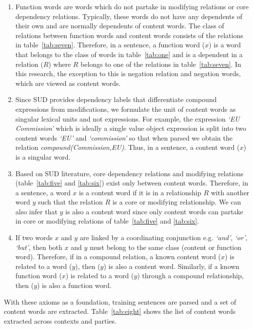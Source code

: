\begin{enumerate}
\item
Function words are words which do not partake in modifying relations or core dependency relations. Typically, these words do not have any dependents of their own and are normally dependents of content words. The class of relations between function words and content words consists of the relations in table~\ref{tab:seven}. Therefore, in a sentence, a function word ($x$) is a word that belongs to the class of words in table~\ref{tab:one} and is a dependent in a relation ($R$) where $R$ belongs to one of the relations in table~\ref{tab:seven}. In this research, the exception to this is negation relation and negation words, which are viewed as content words.
\item
Since SUD provides dependency labels that differentiate compound expressions from modifications, we formulate the unit of content words as singular lexical units and not expressions. For example, the expression \textit{`EU Commission'} which is ideally a single value object expression is split into two content words \textit{`EU'} and \textit{`commission'} so that when parsed we obtain the relation \textit{compound(Commission,EU)}. Thus, in a sentence, a content word ($x$) is a singular word.
\item
Based on SUD literature, core dependency relations and modifying relations (table~\ref{tab:five} and \ref{tab:six}) exist only between content words. Therefore, in a sentence, a word $x$ is a content word if it is in a relationship $R$ with another word $y$ such that the relation $R$ is a core or modifying relationship. We can also infer that $y$ is also a content word since only content words can partake in core or modifying relations of table~\ref{tab:five} and \ref{tab:six}. 
\item
If two words $x$ and $y$ are linked by a coordinating conjunction e.g. \textit{`and'}, \textit{`or'}, \textit{`but'}, then both $x$ and $y$ must belong to the same class (content or function word). Therefore, if in a compound relation, a known content word ($x$) is related to a word ($y$), then ($y$) is also a content word. Similarly, if a known function word ($x$) is related to a word ($y$) through a compound relationship, then ($y$) is also a function word. 

\end{enumerate}

With these axioms as a foundation, training sentences are parsed and a set of content words are extracted. Table~\ref{tab:eight} shows the list of content words extracted across contexts and parties.

